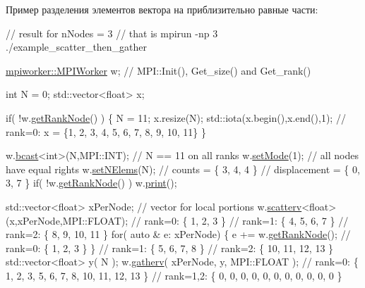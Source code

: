 Пример разделения элементов вектора на приблизительно равные части\-: 
\begin{DoxyCode}
\textcolor{comment}{// result for nNodes = 3}
                                                   \textcolor{comment}{// that is mpirun -np 3 ./example\_scatter\_then\_gather}

  \hyperlink{classmpiworker_1_1MPIWorker}{mpiworker::MPIWorker} w;                          \textcolor{comment}{// MPI::Init(), Get\_size() and
       Get\_rank()}

  \textcolor{keywordtype}{int} N = 0; 
  std::vector<float> x; 

  \textcolor{keywordflow}{if}( !w.\hyperlink{classmpiworker_1_1MPIWorker_acbd3bd07d15ffa90a2c112edeecee6e0}{getRankNode}() ) 
  \{ 
      N = 11; 
      x.resize(N);
      std::iota(x.begin(),x.end(),1);              \textcolor{comment}{// rank=0: x = \{1, 2, 3, 4, 5, 6, 7, 8, 9, 10, 11\}}
  \}

  w.\hyperlink{classmpiworker_1_1MPIWorker_ae22bafa8bd4d6515e5b91ef95518c87d}{bcast}<\textcolor{keywordtype}{int}>(N,MPI::INT);                        \textcolor{comment}{// N == 11 on all ranks}
  w.\hyperlink{classmpiworker_1_1MPIWorker_a2ff88f266efae23ec2a12a56bd0472d1}{setMode}(1);                                    \textcolor{comment}{// all nodes have equal rights}
  w.\hyperlink{classmpiworker_1_1MPIWorker_afcce321227c6d15a5fc2145cf59cd54d}{setNElems}(N);                                  \textcolor{comment}{// counts = \{ 3, 4, 4 \}}
                                                   \textcolor{comment}{// displacement  = \{ 0, 3, 7 \}}
  \textcolor{keywordflow}{if}( !w.\hyperlink{classmpiworker_1_1MPIWorker_acbd3bd07d15ffa90a2c112edeecee6e0}{getRankNode}() ) w.\hyperlink{classmpiworker_1_1MPIWorker_ab9f20357773fe10fbe3bc6d92754d4e0}{print}();

  std::vector<float> xPerNode;                     \textcolor{comment}{// vector for local portions}
  w.\hyperlink{classmpiworker_1_1MPIWorker_a24f713941043ab8d54574830a251995b}{scatterv}<\textcolor{keywordtype}{float}>(x,xPerNode,MPI::FLOAT);        \textcolor{comment}{// rank=0: \{ 1, 2, 3 \}}
                                                   \textcolor{comment}{// rank=1: \{ 4, 5, 6, 7 \}}
                                                   \textcolor{comment}{// rank=2: \{ 8, 9, 10, 11 \}}
  \textcolor{keywordflow}{for}( \textcolor{keyword}{auto} & e: xPerNode)
  \{
      e += w.\hyperlink{classmpiworker_1_1MPIWorker_acbd3bd07d15ffa90a2c112edeecee6e0}{getRankNode}();                        \textcolor{comment}{// rank=0: \{ 1, 2, 3 \}}
  \}                                                \textcolor{comment}{// rank=1: \{ 5, 6, 7, 8 \}}
                                                   \textcolor{comment}{// rank=2: \{ 10, 11, 12, 13 \}}
  std::vector<float> y( N );
  w.\hyperlink{classmpiworker_1_1MPIWorker_aff6b4d55cb55caa37c9a0cb08b3c5661}{gatherv}( xPerNode, y, MPI::FLOAT );            \textcolor{comment}{// rank=0: \{ 1, 2, 3, 5, 6, 7, 8, 10, 11, 12, 13
       \}}
                                                   \textcolor{comment}{// rank=1,2: \{ 0, 0, 0, 0, 0, 0, 0, 0, 0, 0, 0 \}}


\end{DoxyCode}
